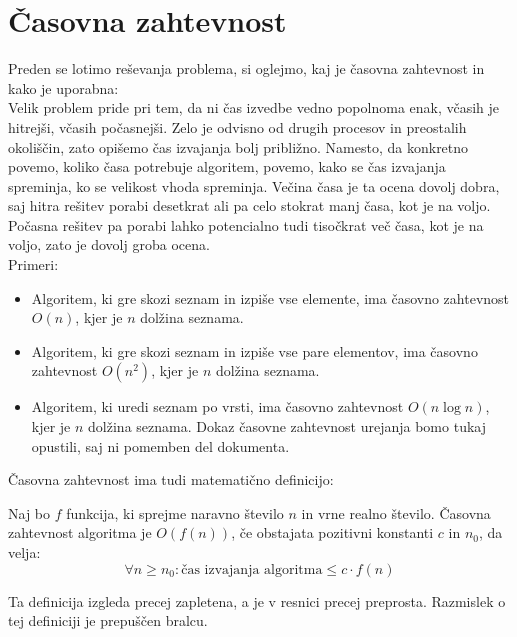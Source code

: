 \section{Časovna zahtevnost}\label{sec:casovna-zahtevnost}
Preden se lotimo reševanja problema, si oglejmo, kaj je časovna zahtevnost in kako je uporabna:\\
Velik problem pride pri tem, da ni čas izvedbe vedno popolnoma enak, včasih je hitrejši, včasih počasnejši.
Zelo je odvisno od drugih procesov in preostalih okoliščin, zato opišemo čas izvajanja bolj približno.
Namesto, da konkretno povemo, koliko časa potrebuje algoritem, povemo, kako se čas izvajanja spreminja, ko se velikost vhoda spreminja.
Večina časa je ta ocena dovolj dobra, saj hitra rešitev porabi desetkrat ali pa celo stokrat manj časa, kot je na voljo.
Počasna rešitev pa porabi lahko potencialno tudi tisočkrat več časa, kot je na voljo, zato je dovolj groba ocena.\\
Primeri:
\begin{itemize}
    \item Algoritem, ki gre skozi seznam in izpiše vse elemente, ima časovno zahtevnost $O(n)$, kjer je $n$ dolžina seznama.
    \item Algoritem, ki gre skozi seznam in izpiše vse pare elementov, ima časovno zahtevnost $O(n^2)$, kjer je $n$ dolžina seznama.
    \item Algoritem, ki uredi seznam po vrsti, ima časovno zahtevnost $O(n\log n)$, kjer je $n$ dolžina seznama.
    Dokaz časovne zahtevnost urejanja bomo tukaj opustili, saj ni pomemben del dokumenta.
\end{itemize}
Časovna zahtevnost ima tudi matematično definicijo:
\begin{definition}
    Naj bo $f$ funkcija, ki sprejme naravno število $n$ in vrne realno število.
    Časovna zahtevnost algoritma je $O(f(n))$, če obstajata pozitivni konstanti $c$ in $n_0$, da velja:
    \begin{equation*}
        \forall n \geq n_0: \text{čas izvajanja algoritma} \leq c \cdot f(n)
    \end{equation*}
\end{definition}
Ta definicija izgleda precej zapletena, a je v resnici precej preprosta.
Razmislek o tej definiciji je prepuščen bralcu.\\

